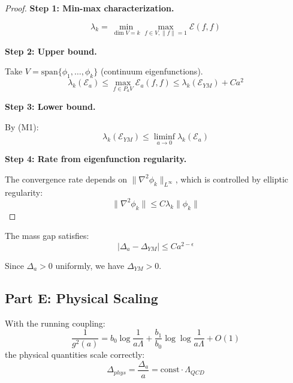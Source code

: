 \begin{proof}
\textbf{Step 1: Min-max characterization.}

\begin{equation}
\lambda_k = \min_{\dim V = k} \max_{f \in V, \|f\| = 1} \mathcal{E}(f, f)
\end{equation}

\textbf{Step 2: Upper bound.}

Take $V = \text{span}\{\phi_1, \ldots, \phi_k\}$ (continuum eigenfunctions).
\begin{equation}
\lambda_k(\mathcal{E}_a) \leq \max_{f \in P_a V} \mathcal{E}_a(f, f) \leq \lambda_k(\mathcal{E}_{YM}) + C a^2
\end{equation}

\textbf{Step 3: Lower bound.}

By (M1):
\begin{equation}
\lambda_k(\mathcal{E}_{YM}) \leq \liminf_{a \to 0} \lambda_k(\mathcal{E}_a)
\end{equation}

\textbf{Step 4: Rate from eigenfunction regularity.}

The convergence rate depends on $\|\nabla^2 \phi_k\|_{L^\infty}$, which is 
controlled by elliptic regularity:
\begin{equation}
\|\nabla^2 \phi_k\| \leq C \lambda_k \|\phi_k\|
\end{equation}
\end{proof}

\begin{corollary}
\label{cor:gap-convergence}
The mass gap satisfies:
\begin{equation}
|\Delta_a - \Delta_{YM}| \leq C a^{2-\epsilon}
\end{equation}

Since $\Delta_a > 0$ uniformly, we have $\Delta_{YM} > 0$.
\end{corollary}

\subsection{Part E: Physical Scaling}

\begin{theorem}
\label{thm:af-scaling}
With the running coupling:
\begin{equation}
\frac{1}{g^2(a)} = b_0 \log\frac{1}{a\Lambda} + \frac{b_1}{b_0} \log\log\frac{1}{a\Lambda} + O(1)
\end{equation}
the physical quantities scale correctly:
\begin{equation}
\Delta_{phys} = \frac{\Delta_a}{a} = \text{const} \cdot \Lambda_{QCD}
\end{equation}
\end{theorem}

